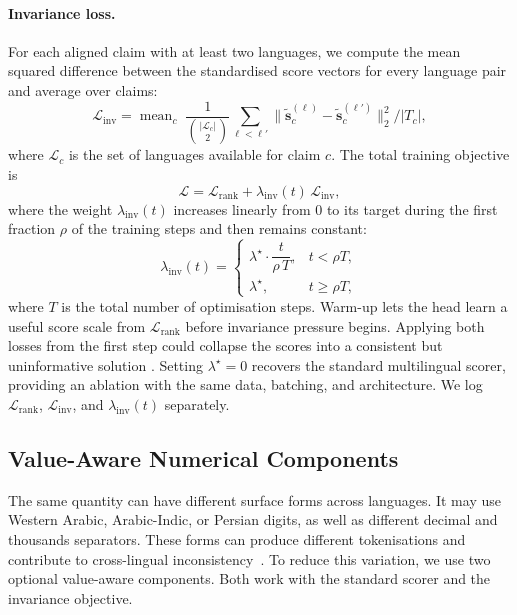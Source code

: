 \paragraph{Invariance loss.}
For each aligned claim with at least two languages, we compute the mean squared difference between the
standardised score vectors for every language pair and average over claims:
\begin{equation}
\label{eq:invloss}
\mathcal{L}_{\text{inv}}=
\operatorname{mean}_{c}\;
\frac{1}{\binom{|\mathcal{L}_c|}{2}}
\sum_{\ell<\ell'}
\bigl\lVert \tilde{\mathbf{s}}^{(\ell)}_c-\tilde{\mathbf{s}}^{(\ell')}_c \bigr\rVert_2^2 \big/ |T_c|,
\end{equation}
where $\mathcal{L}_c$ is the set of languages available for claim $c$. The total training objective is
\begin{equation}
\label{eq:total}
\mathcal{L}=\mathcal{L}_{\text{rank}}+\lambda_{\text{inv}}(t)\,\mathcal{L}_{\text{inv}},
\end{equation}
where the weight $\lambda_{\text{inv}}(t)$ increases linearly from $0$ to its target during the first
fraction $\rho$ of the training steps and then remains constant:
\begin{equation}
\label{eq:warmup}
\lambda_{\text{inv}}(t)=
\begin{cases}
\lambda^\star\cdot \dfrac{t}{\rho\,T}, & t<\rho T,\\[1.2ex]
\lambda^\star, & t\ge \rho T,
\end{cases}
\end{equation}
where $T$ is the total number of optimisation steps. Warm-up lets the head learn a useful score scale
from $\mathcal{L}_{\text{rank}}$ before invariance pressure begins. Applying both losses from the
first step could collapse the scores into a consistent but uninformative solution
\cite{elazar2021measuringimprovingconsistencypretrained,Qi_2023}. Setting $\lambda^\star=0$ recovers
the standard multilingual scorer, providing an ablation with the same data, batching, and
architecture. We log $\mathcal{L}_{\text{rank}}$, $\mathcal{L}_{\text{inv}}$, and
$\lambda_{\text{inv}}(t)$ separately.

\subsection{Value-Aware Numerical Components}
\label{subsec:method-numeric}

The same quantity can have different surface forms across languages. It may use Western Arabic,
Arabic-Indic, or Persian digits, as well as different decimal and thousands separators. These forms
can produce different tokenisations and contribute to cross-lingual
inconsistency~\cite{reddy2026effectscriptsformatsllm,
wallace2019nlpmodelsknownumbers,
bhattacharya2025investigatinginteractionlinguisticmathematical}. To reduce this variation, we
use two optional value-aware components. Both work with the standard scorer and the invariance
objective.

